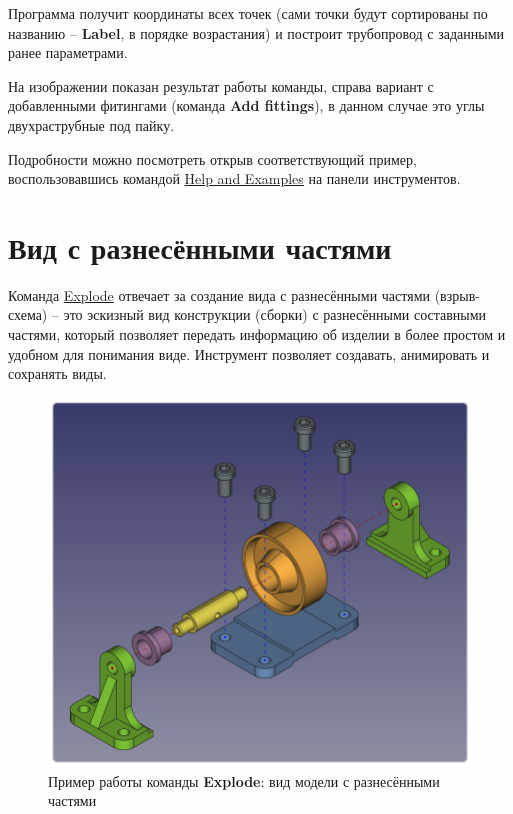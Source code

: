 \documentclass[a4paper,12pt]{article}
\begin{document}
Программа получит координаты всех точек (сами точки будут сортированы по названию -- \textbf{Label}, в порядке возрастания) и построит трубопровод с заданными ранее параметрами.

На изображении показан результат работы команды, справа вариант с добавленными фитингами (команда \textbf{Add fittings}), в данном случае это углы двухраструбные под пайку.

Подробности можно посмотреть открыв соответствующий пример, воспользовавшись командой \hyperref[sec:10]{Help and Examples} на панели инструментов.

\pagebreak


\section{Вид с разнесёнными частями}

Команда \hyperref[sec:8]{Explode} отвечает за создание вида с разнесёнными частями (взрыв-схема) -- это эскизный вид конструкции (сборки) с разнесёнными составными частями, который позволяет передать информацию об изделии в более простом и удобном для понимания виде. Инструмент позволяет создавать, анимировать и сохранять виды.

\begin{figure}[htp]
	\centering
	\includegraphics[scale=0.42]{img/exploded_m_result.png}
	\caption{Пример работы команды \textbf{Explode}: вид модели с разнесёнными частями}
	\label{sec:exploded_m_result}
\end{figure}
\end{document}
